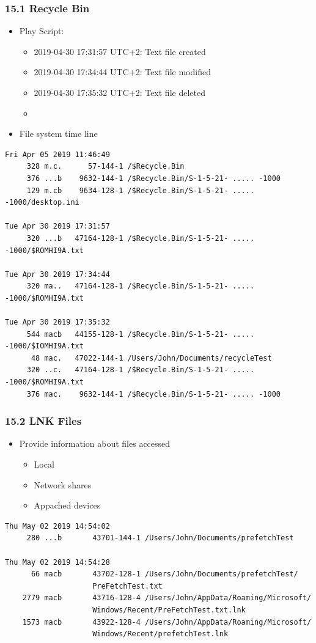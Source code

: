 \begin{frame}[fragile]
  \frametitle{15.1 Recycle Bin}
    \begin{itemize}
        \item Play Script:
            \begin{itemize}
                \item 2019-04-30 17:31:57 UTC+2: Text file created
		\item 2019-04-30 17:34:44 UTC+2: Text file modified
		\item 2019-04-30 17:35:32 UTC+2: Text file deleted
		\item[]
            \end{itemize}
        \item File system time line
    \end{itemize}
  \begin{lstlisting}[basicstyle=\tiny]
Fri Apr 05 2019 11:46:49
     328 m.c.      57-144-1 /$Recycle.Bin
     376 ...b    9632-144-1 /$Recycle.Bin/S-1-5-21- ..... -1000
     129 m.cb    9634-128-1 /$Recycle.Bin/S-1-5-21- ..... -1000/desktop.ini

Tue Apr 30 2019 17:31:57
     320 ...b   47164-128-1 /$Recycle.Bin/S-1-5-21- ..... -1000/$ROMHI9A.txt

Tue Apr 30 2019 17:34:44
     320 ma..   47164-128-1 /$Recycle.Bin/S-1-5-21- ..... -1000/$ROMHI9A.txt

Tue Apr 30 2019 17:35:32
     544 macb   44155-128-1 /$Recycle.Bin/S-1-5-21- ..... -1000/$IOMHI9A.txt
      48 mac.   47022-144-1 /Users/John/Documents/recycleTest
     320 ..c.   47164-128-1 /$Recycle.Bin/S-1-5-21- ..... -1000/$ROMHI9A.txt
     376 mac.    9632-144-1 /$Recycle.Bin/S-1-5-21- ..... -1000
  \end{lstlisting}
\end{frame}


\begin{frame}[fragile]
  \frametitle{15.2 LNK Files}
    \begin{itemize}
        \item Provide information about files accessed
        \begin{itemize}
            \item Local
            \item Network shares
            \item Appached devices
        \end{itemize}
    \end{itemize}
  \begin{lstlisting}[basicstyle=\tiny]
Thu May 02 2019 14:54:02
     280 ...b       43701-144-1 /Users/John/Documents/prefetchTest
  
Thu May 02 2019 14:54:28
      66 macb       43702-128-1 /Users/John/Documents/prefetchTest/
      				PreFetchTest.txt
    2779 macb       43716-128-4 /Users/John/AppData/Roaming/Microsoft/
    				Windows/Recent/PreFetchTest.txt.lnk
    1573 macb       43922-128-4 /Users/John/AppData/Roaming/Microsoft/
    				Windows/Recent/prefetchTest.lnk
  \end{lstlisting}
\end{frame}


